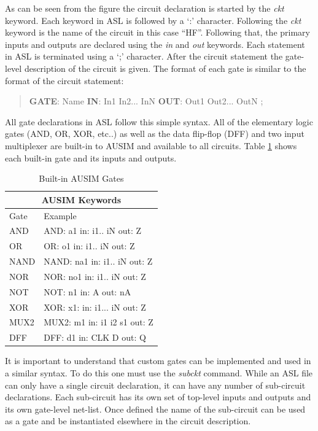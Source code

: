 \documentclass[12pt]{report}
\begin{document}
As can be seen from the figure the circuit declaration is started by the \textit{ckt} keyword\cite{asl}.  Each keyword in ASL is followed by a `:' character\cite{asl}.  Following the \textit{ckt} keyword is the name of the circuit in this case ``HF''.  Following that, the primary inputs and outputs are declared using the \textit{in} and \textit{out} keywords.  Each statement in ASL is terminated using a `;' character\cite{asl}.  After the circuit statement the gate-level description of the circuit is given.  The format of each gate is similar to the format of the circuit statement:
\begin{quote}
	\textbf{GATE}: Name \textbf{IN}: In1 In2... InN \textbf{OUT}: Out1 Out2... OutN ;\cite{asl}
\end{quote}
All gate declarations in ASL follow this simple syntax.  All of the elementary logic gates (AND, OR, XOR, etc..) as well as the data flip-flop (DFF) and two input multiplexer are built-in to AUSIM and available to all circuits\cite{asl}.  Table \ref{tbl:ASLGates} shows each built-in gate and its inputs and outputs.
\begin{table}[bht]
\caption{Built-in AUSIM Gates\cite{asl}}
\begin{center}
\begin{tabular}{|l|l|}
\hline
\multicolumn{2}{|c|}{AUSIM Keywords} \\ \hline
Gate & Example \\ \hline
AND & AND: a1 in: i1.. iN out: Z \\ \hline
OR & OR: o1 in: i1.. iN out: Z \\ \hline
NAND & NAND: na1 in: i1.. iN out: Z \\ \hline
NOR & NOR: no1 in: i1.. iN out: Z \\ \hline
NOT & NOT: n1 in: A out: nA \\ \hline
XOR & XOR: x1: in: i1... iN out: Z \\ \hline
MUX2 & MUX2: m1 in: i1 i2 s1 out: Z \\ \hline
DFF & DFF: d1 in: CLK D out: Q \\ \hline
\end{tabular}
\end{center}
\label{tbl:ASLGates}
\end{table}

It is important to understand that custom gates can be implemented and used in a similar syntax.  To do this one must use the \textit{subckt} command.  While an ASL file can only have a single circuit declaration, it can have any number of sub-circuit declarations\cite{asl}.  Each sub-circuit has its own set of top-level inputs and outputs and its own gate-level net-list.  Once defined the name of the sub-circuit can be used as a gate and be instantiated elsewhere in the circuit description.  
\end{document}
